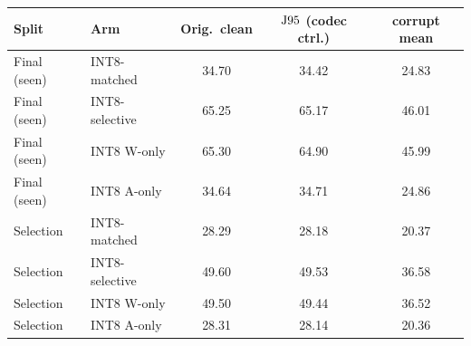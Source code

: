 \begin{tabular}{llccc}
\toprule
Split & Arm & Orig.\ clean & $\mathrm{J95}$ (codec ctrl.) & corrupt mean \\
\midrule
Final (seen) & INT8-matched & 34.70 & 34.42 & 24.83 \\
Final (seen) & INT8-selective & 65.25 & 65.17 & 46.01 \\
Final (seen) & INT8 W-only & 65.30 & 64.90 & 45.99 \\
Final (seen) & INT8 A-only & 34.64 & 34.71 & 24.86 \\
\addlinespace[2pt]
Selection & INT8-matched & 28.29 & 28.18 & 20.37 \\
Selection & INT8-selective & 49.60 & 49.53 & 36.58 \\
Selection & INT8 W-only & 49.50 & 49.44 & 36.52 \\
Selection & INT8 A-only & 28.31 & 28.14 & 20.36 \\
\bottomrule
\end{tabular}
